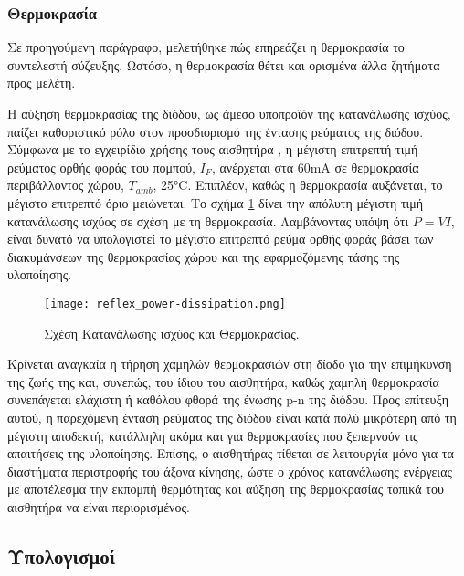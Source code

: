 \subsubsection{Θερμοκρασία}

Σε προηγούμενη παράγραφο, μελετήθηκε πώς επηρεάζει η θερμοκρασία το συντελεστή
σύζευξης. Ωστόσο, η θερμοκρασία θέτει και ορισμένα άλλα ζητήματα προς μελέτη.

Η αύξηση θερμοκρασίας της διόδου, ως άμεσο υποπροϊόν της κατανάλωσης ισχύος,
παίζει καθοριστικό ρόλο στον προσδιορισμό της έντασης ρεύματος της διόδου.
Σύμφωνα με το εγχειρίδιο χρήσης τους αισθητήρα \parencite{vishay09}, η μέγιστη
επιτρεπτή τιμή ρεύματος ορθής φοράς του πομπού, $I_F$, ανέρχεται στα 60mA σε
θερμοκρασία περιβάλλοντος χώρου, $T_{amb}$, 25°C. Επιπλέον, καθώς η θερμοκρασία
αυξάνεται, το μέγιστο επιτρεπτό όριο μειώνεται.
Το σχήμα \ref{fig:reflex:power-dissipation} δίνει την απόλυτη μέγιστη τιμή
κατανάλωσης ισχύος σε σχέση με τη θερμοκρασία. Λαμβάνοντας υπόψη ότι $P = VI$,
είναι δυνατό να υπολογιστεί το μέγιστο επιτρεπτό ρεύμα ορθής φοράς βάσει των
διακυμάνσεων της θερμοκρασίας χώρου και της εφαρμοζόμενης τάσης της υλοποίησης.

\begin{figure}
    \caption{Σχέση Κατανάλωσης ισχύος και Θερμοκρασίας.
    \label{fig:reflex:power-dissipation}}
    \begin{center}%
    \texttt{[image: reflex\_power-dissipation.png]}
    \end{center}

\end{figure}

Κρίνεται αναγκαία η τήρηση χαμηλών θερμοκρασιών στη δίοδο για την επιμήκυνση της
ζωής της και, συνεπώς, του ίδιου του αισθητήρα, καθώς χαμηλή θερμοκρασία
συνεπάγεται ελάχιστη ή καθόλου φθορά της ένωσης p-n της διόδου. Προς επίτευξη
αυτού, η παρεχόμενη ένταση ρεύματος της διόδου είναι κατά πολύ μικρότερη από τη
μέγιστη αποδεκτή, κατάλληλη ακόμα και για θερμοκρασίες που ξεπερνούν τις
απαιτήσεις της υλοποίησης. Επίσης, ο αισθητήρας τίθεται σε λειτουργία μόνο για
τα διαστήματα περιστροφής του άξονα κίνησης, ώστε ο χρόνος κατανάλωσης ενέργειας
με αποτέλεσμα την εκπομπή θερμότητας και αύξηση της θερμοκρασίας τοπικά του
αισθητήρα να είναι περιορισμένος.


\subsection{Υπολογισμοί}

